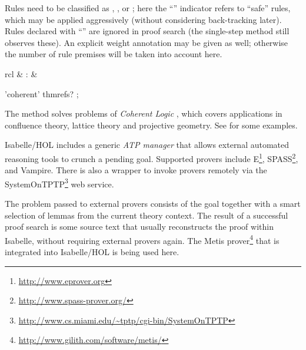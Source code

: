 \begin{isabellebody}
\begin{isamarkuptext}
  Rules need to be classified as \hyperlink{attribute.Pure.intro}{\mbox{}},
  \hyperlink{attribute.Pure.elim}{\mbox{}}, or \hyperlink{attribute.Pure.dest}{\mbox{}}; here the
  ``\isa{{\isachardoublequote}{\isacharbang}{\isachardoublequote}}'' indicator refers to ``safe'' rules, which may be
  applied aggressively (without considering back-tracking later).
  Rules declared with ``\isa{{\isachardoublequote}{\isacharquery}{\isachardoublequote}}'' are ignored in proof search (the
  single-step \hyperlink{method.rule}{\mbox{}} method still observes these).  An
  explicit weight annotation may be given as well; otherwise the
  number of rule premises will be taken into account here.%
\end{isamarkuptext}%
\isamarkuptrue%
%
\isamarkuptrue%
%
\begin{isamarkuptext}%
\begin{matharray}{rcl}
    \hypertarget{method.HOL.coherent}{\hyperlink{method.HOL.coherent}{\mbox{}}} & : &  \\
  \end{matharray}

  \begin{rail}
    'coherent' thmrefs?
    ;
  \end{rail}

  The \hyperlink{method.HOL.coherent}{\mbox{}} method solves problems of
  \emph{Coherent Logic} \cite{Bezem-Coquand:2005}, which covers
  applications in confluence theory, lattice theory and projective
  geometry.  See \hyperlink{file.~~/src/HOL/ex/Coherent.thy}{\mbox{}} for some
  examples.%
\end{isamarkuptext}%
\isamarkuptrue%
%
\isamarkuptrue%
%
\begin{isamarkuptext}%
Isabelle/HOL includes a generic \emph{ATP manager} that allows
  external automated reasoning tools to crunch a pending goal.
  Supported provers include E\footnote{\url{http://www.eprover.org}},
  SPASS\footnote{\url{http://www.spass-prover.org/}}, and Vampire.
  There is also a wrapper to invoke provers remotely via the
  SystemOnTPTP\footnote{\url{http://www.cs.miami.edu/~tptp/cgi-bin/SystemOnTPTP}}
  web service.

  The problem passed to external provers consists of the goal together
  with a smart selection of lemmas from the current theory context.
  The result of a successful proof search is some source text that
  usually reconstructs the proof within Isabelle, without requiring
  external provers again.  The Metis
  prover\footnote{\url{http://www.gilith.com/software/metis/}} that is
  integrated into Isabelle/HOL is being used here.


\end{isamarkuptext}
\end{isabellebody}
